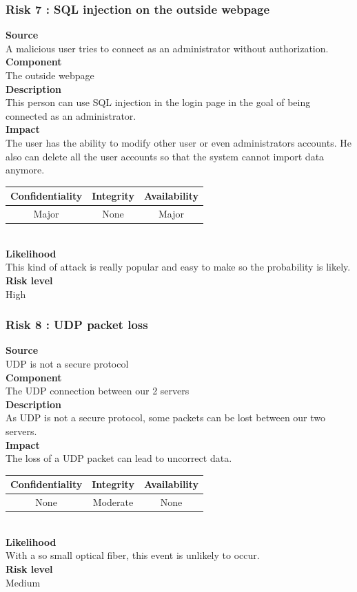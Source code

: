 \documentclass[a4paper,11pt]{article}
\begin{document}
\subsubsection{Risk 7 : SQL injection on the outside webpage }
\textbf{Source} \\A malicious user tries to connect as an administrator without authorization.\\
\textbf{Component} \\The outside webpage\\
\textbf{Description}\\This person can use SQL injection in the login page in the goal of being connected as an administrator. \\
\textbf{Impact}\\
The user has the ability to modify other user or even administrators accounts. He also can delete all the user accounts so that the system cannot import data anymore.\\
\begin{tabular}{|c|c|c|}
\hline
Confidentiality & Integrity & Availability \\
\hline
Major & None & Major \\
\hline
\end{tabular}\\
\textbf{Likelihood}\\ This kind of attack is really popular and easy to make so the probability is likely.\\
\textbf{Risk level}\\High\\

\subsubsection{Risk 8 : UDP packet loss  }
\textbf{Source} \\UDP is not a secure protocol \\
\textbf{Component} \\The UDP connection between our 2 servers\\
\textbf{Description}\\As UDP is not a secure protocol, some packets can be lost between our two servers. \\
\textbf{Impact}\\
The loss of a UDP packet can lead to uncorrect data.\\
\begin{tabular}{|c|c|c|}
\hline
Confidentiality & Integrity & Availability \\
\hline
None &Moderate & None \\
\hline
\end{tabular}\\
\textbf{Likelihood}\\ With a so small optical fiber, this event is unlikely to occur.\\
\textbf{Risk level}\\Medium\\
\end{document}
